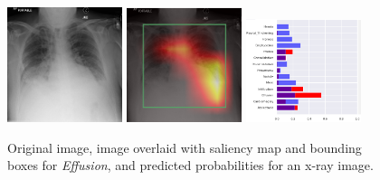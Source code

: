 \documentclass[12pt,oneside,a4paper]{report}
\begin{document}
\begin{figure}[H]
  \centering
  \includegraphics[width=0.3\textwidth]{images/preds/effusion}\hspace{0.01\textwidth}%
  \includegraphics[width=0.3\textwidth]{images/preds/effusion_cam}\hspace{0.01\textwidth}%
  \includegraphics[width=0.3\textwidth]{images/preds/effusion_probs}\\[0.01\textwidth]
  \caption{Original image, image overlaid with saliency map and bounding boxes
    for \emph{Effusion}, and predicted probabilities for an x-ray image.}
  \label{examples_3}
\end{figure}
\end{document}
